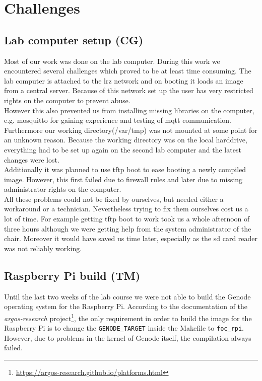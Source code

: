 \section{Challenges}
\label{sec:challenges}


\subsection{Lab computer setup (CG)}
Most of our work was done on the lab computer. During this work we encountered several challenges which proved to be at least time consuming. The lab computer is attached to the lrz network and on booting it loads an image from a central server. Because of this network set up the user has very restricted rights on the computer to prevent abuse.\\

However this also prevented us from installing missing libraries on the computer, e.g. mosquitto for gaining experience and testing of mqtt communication. Furthermore our working directory(/var/tmp) was not mounted at some point for an unknown reason. Because the working directory was on the local harddrive, everything had to be set up again on the second lab computer and the latest changes were lost.\\

Additionally it was planned to use tftp boot to ease booting a newly compiled image. However, this first failed due to firewall rules and later due to missing administrator rights on the computer.\\

All these problems could not be fixed by ourselves, but needed either a workaround or a technician. Nevertheless trying to fix them ourselves cost us a lot of time. For example getting tftp boot to work took us a whole afternoon of three hours although we were getting help from the system administrator of the chair. Moreover it would have saved us time later, especially as the sd card reader was not reliably working.

\subsection{Raspberry Pi build (TM)}
\label{sec:pi-problems}
Until the last two weeks of the lab course we were not able to build the Genode operating system for the Raspberry Pi. According to the documentation of the \textit{argos-research} project\footnote{\url{https://argos-research.github.io/platforms.html}}, the only requirement in order to build the image for the Raspberry Pi is to change the \texttt{GENODE\_TARGET} inside the Makefile to \texttt{foc\_rpi}. However, due to problems in the kernel of Genode itself, the compilation always failed. \\

